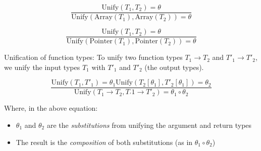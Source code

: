 \documentclass[11pt]{article}
\begin{document}
\[
\frac{\text{Unify}(T_1,T_2) = \theta}{\text{Unify}(\text{Array}(T_1), \text{Array}(T_2)) = \theta}
\]

\[
\frac{\text{Unify}(T_1,T_2) = \theta}{\text{Unify}(\text{Pointer}(T_1), \text{Pointer}(T_2)) = \theta}
\]

Unification of function types:
To unify two function types \(T_1 \to T_2\) and \(T'_1 \to T'_2\), we unify the input
types \(T_1\) with \(T'_1\) and \(T'_2\) (the output types).

\[
\frac{\text{Unify}(T_1, T'_1) = \theta_1
      \text{Unify}(T_2[\theta_1], T'_2[\theta_1]) = \theta_2}
     {\text{Unify}(T_1 \to T_2, T_'1 \to T'_2) = \theta_1 \circ \theta_2}
\]

Where, in the above equation:
\begin{itemize}
\item \(\theta_1\) and \(\theta_2\) are the \emph{substitutions} from unifying the argument and return types
\item The result is the \emph{composition} of both substitutions (as in \(\theta_1 \circ \theta_2\))
\end{itemize}
\end{document}
